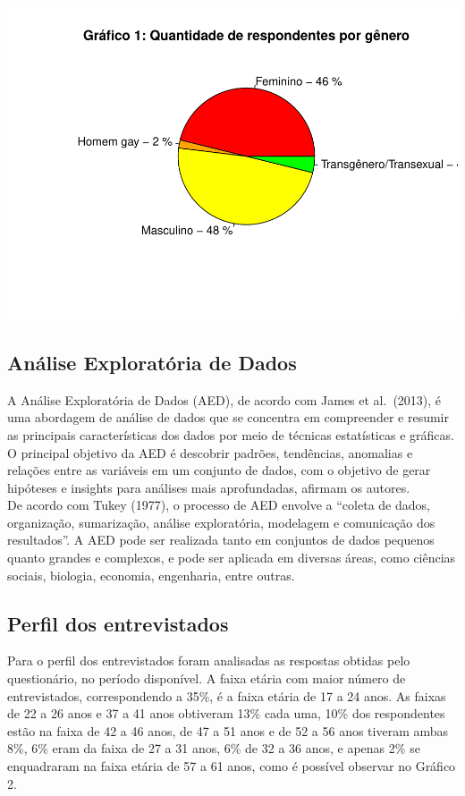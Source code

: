 \documentclass[
]{article}
\begin{document}
\includegraphics{consequencias-oriundas-da-pandemia-v1.0_files/figure-latex/grafico-1-1.pdf}

\hypertarget{anuxe1lise-exploratuxf3ria-de-dados}{%
\subsection{Análise Exploratória de
Dados}\label{anuxe1lise-exploratuxf3ria-de-dados}}

A Análise Exploratória de Dados (AED), de acordo com James et
al.~(2013), é uma abordagem de análise de dados que se concentra em
compreender e resumir as principais características dos dados por meio
de técnicas estatísticas e gráficas. O principal objetivo da AED é
descobrir padrões, tendências, anomalias e relações entre as variáveis
em um conjunto de dados, com o objetivo de gerar hipóteses e insights
para análises mais aprofundadas, afirmam os autores.\\
De acordo com Tukey (1977), o processo de AED envolve a ``coleta de
dados, organização, sumarização, análise exploratória, modelagem e
comunicação dos resultados''. A AED pode ser realizada tanto em
conjuntos de dados pequenos quanto grandes e complexos, e pode ser
aplicada em diversas áreas, como ciências sociais, biologia, economia,
engenharia, entre outras.

\hypertarget{perfil-dos-entrevistados}{%
\subsection{Perfil dos entrevistados}\label{perfil-dos-entrevistados}}

Para o perfil dos entrevistados foram analisadas as respostas obtidas
pelo questionário, no período disponível. A faixa etária com maior
número de entrevistados, correspondendo a 35\%, é a faixa etária de 17 a
24 anos. As faixas de 22 a 26 anos e 37 a 41 anos obtiveram 13\% cada
uma, 10\% dos respondentes estão na faixa de 42 a 46 anos, de 47 a 51
anos e de 52 a 56 anos tiveram ambas 8\%, 6\% eram da faixa de 27 a 31
anos, 6\% de 32 a 36 anos, e apenas 2\% se enquadraram na faixa etária
de 57 a 61 anos, como é possível observar no Gráfico 2.
\end{document}

